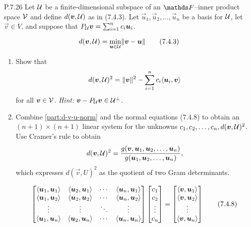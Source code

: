 \documentclass{../homework}
\date{Tuesday 3/5}
\author{}
\begin{document}
\begin{problems}
\item[P.7.26] Let \(\mathcal{U}\) be a finite-dimensional subspace of an
  \(\FF\)--inner product space \(\mathcal{V}\) and define
  \(d(\vec v, \Uspace)\) as in (7.4.3).  Let
  \(\vec u_1, \vec u_2, \dots, \vec u_n\) be a basis for \(\mathcal{U}\),
  let \(\vec v \in V\), and suppose that
  \(P_\Uspace \vec v = \sum_{i=1}^n c_i \vec u_i\).
  \begin{book}
    \[
      d(\vec v, \Uspace)
      = \min_{\vec u \in \Uspace} \norm{\vec v - \vec u}
      \tag{7.4.3}
    \]
  \end{book}
  \begin{enumerate}
  \item
    \label{part:d-v-u-norm}
    Show that
    \[
      d(\vec v, \Uspace)^2
      = \norm{\vec v}^2
      - \sum_{i=1}^n c_i \inner{\vec u_i, \vec v}
    \]
    for all \(\vec v \in \Vspace\).  \textit{Hint:}
    \(\vec v - P_\Uspace \vec v \in \Uspace^\perp\).

    \begin{solution}

    \end{solution}

  \item Combine \ref{part:d-v-u-norm} and the normal equations (7.4.8)
    to obtain an \((n+1) \times (n+1)\) linear system for the unknowns
    \(c_1, c_2, \dots, c_n, d(\vec v, \Uspace)^2\).  Use Cramer's rule
    to obtain
    \[
      d(\vec v, \Uspace)^2
      = \frac{g (\vec v, \vec u_1, \vec u_2, \dots, \vec u_n)}
      {g(\vec u_1, \vec u_2, \dots, \vec u_n)},
    \]
    which expresses \(d(\vec v, U)^2\) as the quotient of two Gram
    determinants.
    \begin{book}
      \[
        \begin{bmatrix}
          \inner{\vec u_1, \vec u_1} &
          \inner{\vec u_2, \vec u_1} & \cdots &
          \inner{\vec u_n, \vec u_1} \\
          \inner{\vec u_1, \vec u_2} &
          \inner{\vec u_2, \vec u_2} & \cdots &
          \inner{\vec u_n, \vec u_2} \\
          \vdots & \vdots & \ddots & \vdots \\
          \inner{\vec u_1, \vec u_n} &
          \inner{\vec u_2, \vec u_n} & \cdots &
          \inner{\vec u_n, \vec u_n}
        \end{bmatrix}
        \begin{bmatrix}
          c_1 \\ c_2 \\ \vdots \\ c_n
        \end{bmatrix}
        =
        \begin{bmatrix}
          \inner{\vec v, \vec u_1} \\
          \inner{\vec v, \vec u_2} \\
          \vdots \\
          \inner{\vec v, \vec u_n} \\
        \end{bmatrix}
        \tag{7.4.8}
      \]
    \end{book}


\end{enumerate}
\end{problems}
\end{document}
